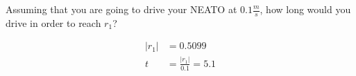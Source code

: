 Assuming that you are going to drive your NEATO at $0.1\frac{m}{s}$, how long would you drive in
order to reach $r_1$?

\begin{solution}
\begin{align*}
    |r_1| &= 0.5099 \\
    t &= \frac{|r_1|}{0.1} = 5.1
\end{align*}
\end{solution}